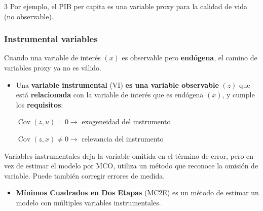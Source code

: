 \documentclass[10pt, a4paper, landscape]{article}
\DeclareMathOperator{\Cov}{Cov}
\begin{document}
\begin{multicols}{3}
Por ejemplo, el PIB per capita es una variable proxy para la calidad de vida (no observable).

\subsubsection*{Instrumental variables}

Cuando una variable de interés \( (x) \) es observable pero \textbf{endógena}, el camino de variables proxy ya no es válido.

\begin{itemize}[leftmargin=*]
	\item Una \textbf{variable instrumental} (VI) \textbf{es una variable observable} \( (z) \) que está \textbf{relacionada} con la variable de interés que es endógena \( (x) \), y cumple los \textbf{requisitos}:
	\begin{center}
		\( \Cov(z, u) = 0 \rightarrow \) exogeneidad del instrumento

		\( \Cov(z, x) \neq 0 \rightarrow \) relevancia del instrumento
	\end{center}
\end{itemize}

Variables instrumentales deja la variable omitida en el término de error, pero en vez de estimar el modelo por MCO, utiliza un método que reconoce la omisión de variable. Puede también corregir errores de medida.

\begin{itemize}[leftmargin=*]
	\item \textbf{Mínimos Cuadrados en Dos Etapas} (MC2E) es un método de estimar un modelo con múltiples variables instrumentales.


\end{itemize}
\end{multicols}
\end{document}

